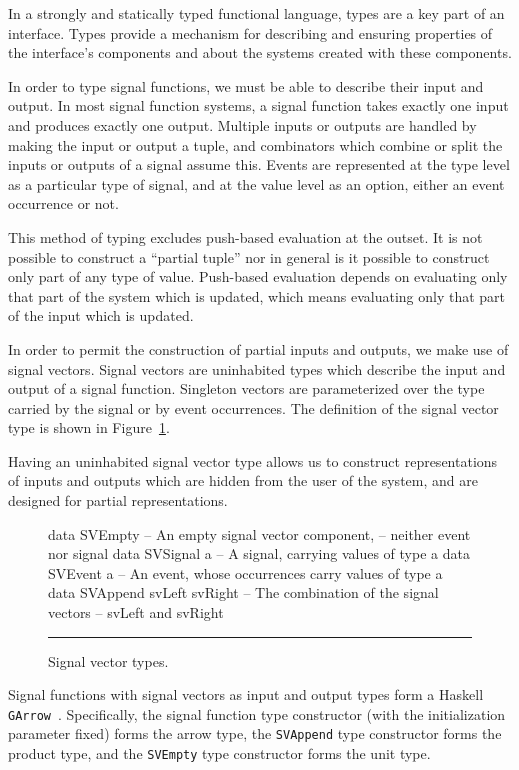 In a strongly and statically typed functional language, types are a key part of
an interface. Types provide a mechanism for describing and ensuring properties
of the interface's components and about the systems created with these
components. 

In order to type signal functions, we must be able to describe their input and
output. In most signal function systems, a signal function takes exactly one
input and produces exactly one output. Multiple inputs or outputs are handled
by making the input or output a tuple, and combinators which combine or split
the inputs or outputs of a signal assume this. Events are represented at the
type level as a particular type of signal, and at the value level as an option,
either an event occurrence or not.

This method of typing excludes push-based evaluation at the outset.
It is not possible to construct a ``partial tuple'' nor in general is it
possible to construct only part of any type of value. Push-based evaluation
depends on evaluating only that part of the system which is updated, which means
evaluating only that part of the input which is updated.

In order to permit the construction of partial inputs and outputs, we make use
of signal vectors. Signal vectors are uninhabited types which describe the input
and output of a signal function. Singleton vectors are parameterized over the
type carried by the signal or by event occurrences. The definition of the signal
vector type is shown in Figure~\ref{figure:signal_vector_types}. 

Having an uninhabited signal vector type allows us to construct representations
of inputs and outputs which are hidden from the user of the system, and are
designed for partial representations.

\begin{figure}
\begin{code}
data SVEmpty    -- An empty signal vector component,
                -- neither event nor signal
data SVSignal a -- A signal, carrying values of type a
data SVEvent a  -- An event, whose occurrences carry values of type a
data SVAppend svLeft svRight -- The combination of the signal vectors
                             -- svLeft and svRight
\end{code}
\hrule
\caption{Signal vector types.}
\label{figure:signal_vector_types}
\end{figure}

Signal functions with signal vectors as input and output types form a
Haskell {\tt GArrow}~\cite{Megacz2011}. Specifically, the signal function
type constructor (with the initialization parameter fixed) forms the arrow
type, the {\tt SVAppend} type constructor forms the product type, and the
{\tt SVEmpty} type constructor forms the unit type.

